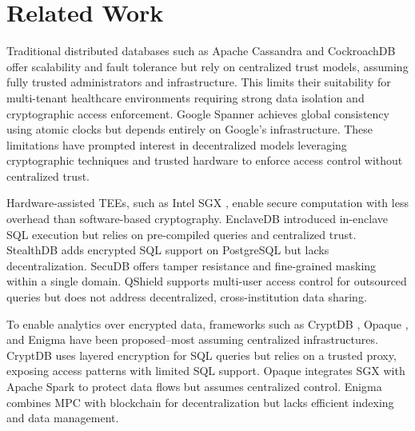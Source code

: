 \documentclass[conference]{IEEEtran}
\begin{document}

\section{Related Work}
Traditional distributed databases such as Apache Cassandra \cite{apachecassandra2025} and CockroachDB \cite{taft2020cockroachdb} offer scalability and fault tolerance but rely on centralized trust models, assuming fully trusted administrators and infrastructure. This limits their suitability for multi-tenant healthcare environments requiring strong data isolation and cryptographic access enforcement. Google Spanner \cite{bacon2017spanner} achieves global consistency using atomic clocks but depends entirely on Google's infrastructure. These limitations have prompted interest in decentralized models leveraging cryptographic techniques and trusted hardware to enforce access control without centralized trust.

Hardware-assisted TEEs, such as Intel SGX \cite{costan2016intel, el2022benchmarking}, enable secure computation with less overhead than software-based cryptography. EnclaveDB \cite{priebe2018enclavedb} introduced in-enclave SQL execution but relies on pre-compiled queries and centralized trust. StealthDB \cite{vinayagamurthy2019stealthdb} adds encrypted SQL support on PostgreSQL but lacks decentralization. SecuDB \cite{yang2024secudb} offers tamper resistance and fine-grained masking within a single domain. QShield \cite{chen2020qshield} supports multi-user access control for outsourced queries but does not address decentralized, cross-institution data sharing.

To enable analytics over encrypted data, frameworks such as CryptDB \cite{popa2011cryptdb}, Opaque \cite{zheng2017opaque}, and Enigma \cite{zyskind2015enigma} have been proposed--most assuming centralized infrastructures. CryptDB uses layered encryption for SQL queries but relies on a trusted proxy, exposing access patterns with limited SQL support. Opaque integrates SGX with Apache Spark to protect data flows but assumes centralized control. Enigma combines MPC with blockchain for decentralization but lacks efficient indexing and data management.
\end{document}
